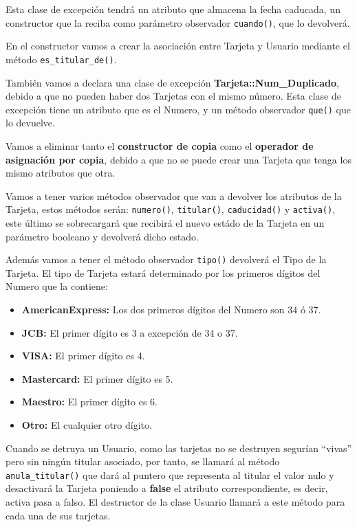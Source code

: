 Esta clase de excepción tendrá un atributo que almacena la fecha caducada, un constructor que la reciba como parámetro observador \texttt{cuando()}, que lo devolverá. 

En el constructor vamos a crear la asociación entre Tarjeta y Usuario mediante el método \texttt{es\_titular\_de()}.

También vamos a declara una clase de excepción \textbf{Tarjeta::Num\_Duplicado}, debido a que no pueden haber dos Tarjetas con el mismo número. Esta clase de excepción tiene un atributo que es el Numero, y un método observador \texttt{que()} que lo devuelve.

Vamos a eliminar tanto el \textbf{constructor de copia} como el \textbf{operador de asignación por copia}, debido a que no se puede crear una Tarjeta que tenga los mismo atributos que otra.

Vamos a tener varios métodos observador que van a devolver los atributos de la Tarjeta, estos métodos serán: \texttt{numero()}, \texttt{titular()}, \texttt{caducidad()} y \texttt{activa()}, este último se sobrecargará que recibirá el nuevo estádo de la Tarjeta en un parámetro booleano y devolverá dicho estado.

Además vamos a tener el método observador \texttt{tipo()} devolverá el Tipo de la Tarjeta. El tipo de Tarjeta estará determinado por los primeros dígitos del Numero que la contiene:
\begin{itemize}
    \item \textbf{AmericanExpress:} Los dos primeros dígitos del Numero son 34 ó 37.
    \item \textbf{JCB:} El primer dígito es 3 a excepción de 34 o 37.
    \item \textbf{VISA:} El primer dígito es 4.
    \item \textbf{Mastercard:} El primer dígito es 5.
    \item \textbf{Maestro:} El primer dígito es 6.
    \item \textbf{Otro:} El cualquier otro dígito.
\end{itemize}

Cuando se detruya un Usuario, como las tarjetas no se destruyen segurían ``vivas'' pero sin ningún titular asociado, por tanto, se llamará al método \texttt{anula\_titular()} que dará al puntero que representa al titular el valor nulo y desactivará la Tarjeta poniendo a \textbf{false} el atributo correspondiente, es decir, activa pasa a falso. El destructor de la clase Usuario llamará a este método para cada una de sus tarjetas.

